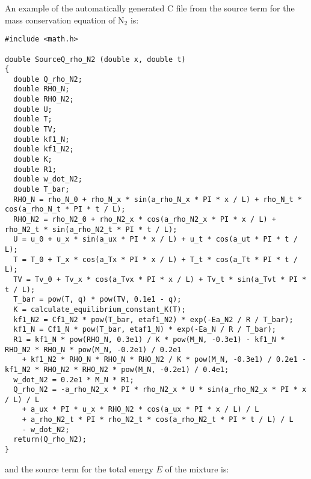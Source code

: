 \documentclass[10pt]{article}
\begin{document}
An example of the automatically generated C file from the source term for the mass conservation equation of N$_2$ is:
\begin{scriptsize}
 \begin{verbatim}
#include <math.h>

double SourceQ_rho_N2 (double x, double t)
{
  double Q_rho_N2;
  double RHO_N;
  double RHO_N2;
  double U;
  double T;
  double TV;
  double kf1_N;
  double kf1_N2;
  double K;
  double R1;
  double w_dot_N2;
  double T_bar;
  RHO_N = rho_N_0 + rho_N_x * sin(a_rho_N_x * PI * x / L) + rho_N_t * cos(a_rho_N_t * PI * t / L);
  RHO_N2 = rho_N2_0 + rho_N2_x * cos(a_rho_N2_x * PI * x / L) + rho_N2_t * sin(a_rho_N2_t * PI * t / L);
  U = u_0 + u_x * sin(a_ux * PI * x / L) + u_t * cos(a_ut * PI * t / L);
  T = T_0 + T_x * cos(a_Tx * PI * x / L) + T_t * cos(a_Tt * PI * t / L);
  TV = Tv_0 + Tv_x * cos(a_Tvx * PI * x / L) + Tv_t * sin(a_Tvt * PI * t / L);
  T_bar = pow(T, q) * pow(TV, 0.1e1 - q);
  K = calculate_equilibrium_constant_K(T);
  kf1_N2 = Cf1_N2 * pow(T_bar, etaf1_N2) * exp(-Ea_N2 / R / T_bar);
  kf1_N = Cf1_N * pow(T_bar, etaf1_N) * exp(-Ea_N / R / T_bar);
  R1 = kf1_N * pow(RHO_N, 0.3e1) / K * pow(M_N, -0.3e1) - kf1_N * RHO_N2 * RHO_N * pow(M_N, -0.2e1) / 0.2e1 
    + kf1_N2 * RHO_N * RHO_N * RHO_N2 / K * pow(M_N, -0.3e1) / 0.2e1 - kf1_N2 * RHO_N2 * RHO_N2 * pow(M_N, -0.2e1) / 0.4e1;
  w_dot_N2 = 0.2e1 * M_N * R1;
  Q_rho_N2 = -a_rho_N2_x * PI * rho_N2_x * U * sin(a_rho_N2_x * PI * x / L) / L  
    + a_ux * PI * u_x * RHO_N2 * cos(a_ux * PI * x / L) / L 
    + a_rho_N2_t * PI * rho_N2_t * cos(a_rho_N2_t * PI * t / L) / L  
    - w_dot_N2;
  return(Q_rho_N2);
}
 \end{verbatim}
\end{scriptsize}
%
and the source term for the total energy $E$ of the mixture is:
\end{document}
